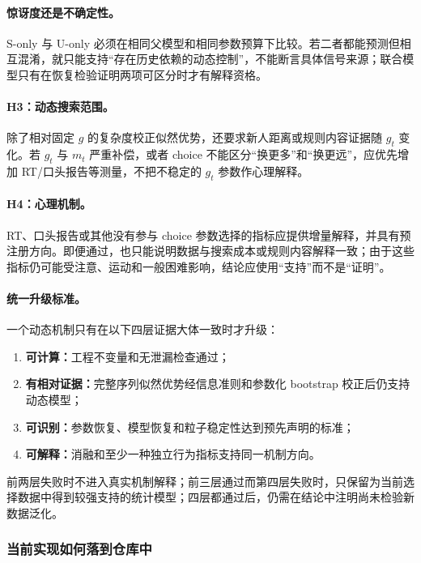 \paragraph{惊讶度还是不确定性。}
S-only 与 U-only 必须在相同父模型和相同参数预算下比较。若二者都能预测但相互混淆，就只能支持“存在历史依赖的动态控制”，不能断言具体信号来源；联合模型只有在恢复检验证明两项可区分时才有解释资格。

\paragraph{H3：动态搜索范围。}
除了相对固定 $g$ 的复杂度校正似然优势，还要求新人距离或规则内容证据随 $g_t$ 变化。若 $g_t$ 与 $m_t$ 严重补偿，或者 choice 不能区分“换更多”和“换更远”，应优先增加 RT/口头报告等测量，不把不稳定的 $g_t$ 参数作心理解释。

\paragraph{H4：心理机制。}
RT、口头报告或其他没有参与 choice 参数选择的指标应提供增量解释，并具有预注册方向。即便通过，也只能说明数据与搜索成本或规则内容解释一致；由于这些指标仍可能受注意、运动和一般困难影响，结论应使用“支持”而不是“证明”。

\paragraph{统一升级标准。}
一个动态机制只有在以下四层证据大体一致时才升级：
\begin{enumerate}
    \item \textbf{可计算：}工程不变量和无泄漏检查通过；
    \item \textbf{有相对证据：}完整序列似然优势经信息准则和参数化 bootstrap 校正后仍支持动态模型；
    \item \textbf{可识别：}参数恢复、模型恢复和粒子稳定性达到预先声明的标准；
    \item \textbf{可解释：}消融和至少一种独立行为指标支持同一机制方向。
\end{enumerate}
前两层失败时不进入真实机制解释；前三层通过而第四层失败时，只保留为当前选择数据中得到较强支持的统计模型；四层都通过后，仍需在结论中注明尚未检验新数据泛化。


\subsubsection{当前实现如何落到仓库中}

